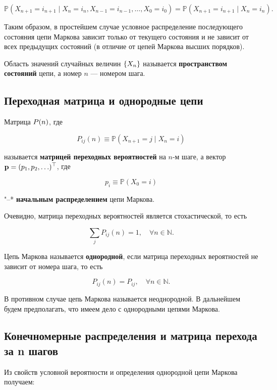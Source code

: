\documentclass{article}
\begin{document}
\begin{equation*}
	\mathbb{P}(X_{n+1}=i_{n+1} \mid X_{n} = i_{n}, X_{n-1} = i_{n-1}, \ldots , X_{0} = i_{0}) = \mathbb{P} (X_{n+1}=i_{n+1} \mid X_{n} = i_{n}).
\end{equation*}

Таким образом, в простейшем случае условное распределение последующего состояния цепи Маркова зависит только от текущего состояния и не зависит от всех предыдущих состояний (в отличие от цепей Маркова высших порядков).

Область значений случайных величин ${\displaystyle \{X_{n}\} }$ называется {\bfseries пространством состояний} цепи, а номер $n$ — номером шага.

\subsection{Переходная матрица и однородные цепи}
Матрица ${\displaystyle P(n)}$, где

\begin{equation*}
	P_{ij}(n) \equiv \mathbb {P}(X_{n+1} = j \mid X_{n}=i)
\end{equation*}

называется {\bfseries матрицей переходных вероятностей} на $n$-м шаге, а вектор ${\displaystyle\mathbf{p} = (p_{1},p_{2},\ldots )^{\top }}$, где

\begin{equation*}
	p_{i} \equiv \mathbb  {P} (X_{0} = i)
\end{equation*}

"--* {\bfseries начальным распределением} цепи Маркова.

Очевидно, матрица переходных вероятностей является стохастической, то есть

\begin{equation*}
	\sum_{j} P_{ij}(n) = 1, \quad \forall n \in {\mathbb{N}}.
\end{equation*}

Цепь Маркова называется {\bfseries однородной}, если матрица переходных вероятностей не зависит от номера шага, то есть

\begin{equation*}
	P_{ij}(n)=P_{ij},\quad \forall n\in {\mathbb{N}}.
\end{equation*}

В противном случае цепь Маркова называется неоднородной. В дальнейшем будем предполагать, что имеем дело с однородными цепями Маркова.

\subsection{Конечномерные распределения и матрица перехода за n шагов}
Из свойств условной вероятности и определения однородной цепи Маркова получаем:
\end{document}
